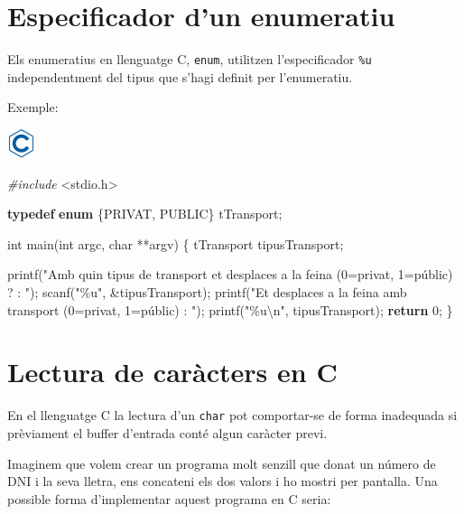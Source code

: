 \documentclass[]{book}
\newenvironment{Shaded}{\begin{snugshade}}{\end{snugshade}}
\newcommand{\ControlFlowTok}[1]{\textcolor[rgb]{0.13,0.29,0.53}{\textbf{#1}}}
\newcommand{\DataTypeTok}[1]{\textcolor[rgb]{0.13,0.29,0.53}{#1}}
\newcommand{\DecValTok}[1]{\textcolor[rgb]{0.00,0.00,0.81}{#1}}
\newcommand{\ImportTok}[1]{#1}
\newcommand{\KeywordTok}[1]{\textcolor[rgb]{0.13,0.29,0.53}{\textbf{#1}}}
\newcommand{\NormalTok}[1]{#1}
\newcommand{\PreprocessorTok}[1]{\textcolor[rgb]{0.56,0.35,0.01}{\textit{#1}}}
\newcommand{\SpecialCharTok}[1]{\textcolor[rgb]{0.00,0.00,0.00}{#1}}
\newcommand{\StringTok}[1]{\textcolor[rgb]{0.31,0.60,0.02}{#1}}
\begin{document}
\hypertarget{especificador-dun-enumeratiu}{%
\section{Especificador d'un enumeratiu}\label{especificador-dun-enumeratiu}}

Els enumeratius en llenguatge C, \texttt{enum}, utilitzen l'especificador \texttt{\%u} independentment del tipus que s'hagi definit per l'enumeratiu.

Exemple:

\includegraphics{./img/c.png}

\begin{Shaded}
\begin{Highlighting}[]
\PreprocessorTok{\#include }\ImportTok{\textless{}stdio.h\textgreater{}}

\KeywordTok{typedef} \KeywordTok{enum}\NormalTok{ \{PRIVAT, PUBLIC\} tTransport;}

\DataTypeTok{int}\NormalTok{ main(}\DataTypeTok{int}\NormalTok{ argc, }\DataTypeTok{char}\NormalTok{ **argv) \{}
\NormalTok{    tTransport tipusTransport;}

\NormalTok{    printf(}\StringTok{"Amb quin tipus de transport et desplaces a la feina (0=privat, 1=públic) ? : "}\NormalTok{);}
\NormalTok{    scanf(}\StringTok{"\%u"}\NormalTok{, \&tipusTransport);}
\NormalTok{    printf(}\StringTok{"Et desplaces a la feina amb transport (0=privat, 1=públic) : "}\NormalTok{);}
\NormalTok{    printf(}\StringTok{"\%u}\SpecialCharTok{\textbackslash{}n}\StringTok{"}\NormalTok{, tipusTransport);}
    \ControlFlowTok{return} \DecValTok{0}\NormalTok{;}
\NormalTok{\}}
\end{Highlighting}
\end{Shaded}

\hypertarget{lectura-de-caracters-en-c}{%
\section{Lectura de caràcters en C}\label{lectura-de-caracters-en-c}}

En el llenguatge C la lectura d'un \texttt{char} pot comportar-se de forma inadequada si prèviament el buffer d'entrada conté algun caràcter previ.

Imaginem que volem crear un programa molt senzill que donat un número de DNI i la seva lletra, ens concateni els dos valors i ho mostri per pantalla. Una possible forma d'implementar aquest programa en C seria:
\end{document}
